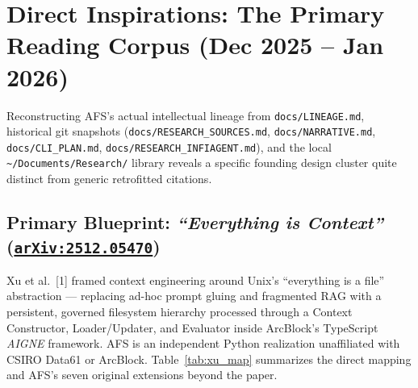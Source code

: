 \documentclass[10pt,letterpaper]{article}
\newcommand{\code}[1]{\texttt{\color{InkNavy}#1}}
\newcommand{\home}{\code{\textasciitilde}}
\newcommand{\arxiv}[1]{\href{https://arxiv.org/abs/#1}{\code{arXiv:#1}}}
\begin{document}
\section{Direct Inspirations: The Primary Reading Corpus (Dec 2025 -- Jan 2026)}

\begin{sloppypar}
Reconstructing AFS's actual intellectual lineage from \code{docs/LINEAGE.md}, historical git snapshots (\code{docs/RESEARCH\_SOURCES.md}, \code{docs/NARRATIVE.md}, \code{docs/CLI\_PLAN.md}, \code{docs/RESEARCH\_INFIAGENT.md}), and the local \home\code{/Documents/Research/} library reveals a specific founding design cluster quite distinct from generic retrofitted citations.
\end{sloppypar}

\subsection{\texorpdfstring{Primary Blueprint: \emph{``Everything is Context''} (\arxiv{2512.05470})}{Primary Blueprint: Everything is Context (arXiv:2512.05470)}}
Xu et al.\ [1] framed context engineering around Unix's ``everything is a file'' abstraction --- replacing ad-hoc prompt gluing and fragmented RAG with a persistent, governed filesystem hierarchy processed through a Context Constructor, Loader/Updater, and Evaluator inside ArcBlock's TypeScript \emph{AIGNE} framework. AFS is an independent Python realization unaffiliated with CSIRO Data61 or ArcBlock. Table~\ref{tab:xu_map} summarizes the direct mapping and AFS's seven original extensions beyond the paper.
\end{document}
